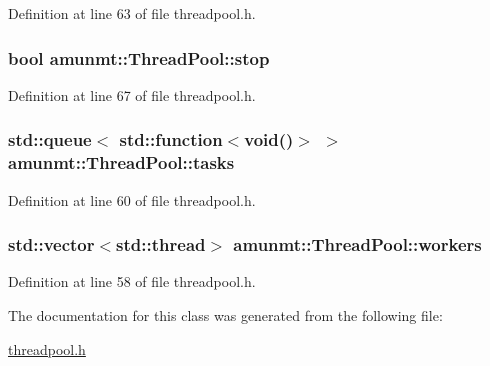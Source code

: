 Definition at line 63 of file threadpool.\+h.

\subsubsection[{\texorpdfstring{stop}{stop}}]{\setlength{\rightskip}{0pt plus 5cm}bool amunmt\+::\+Thread\+Pool\+::stop\hspace{0.3cm}{\ttfamily [private]}}\hypertarget{classamunmt_1_1ThreadPool_abf9a006374a3c361401bf98ecbfeabf7}{}\label{classamunmt_1_1ThreadPool_abf9a006374a3c361401bf98ecbfeabf7}


Definition at line 67 of file threadpool.\+h.

\subsubsection[{\texorpdfstring{tasks}{tasks}}]{\setlength{\rightskip}{0pt plus 5cm}std\+::queue$<$ std\+::function$<$void()$>$ $>$ amunmt\+::\+Thread\+Pool\+::tasks\hspace{0.3cm}{\ttfamily [private]}}\hypertarget{classamunmt_1_1ThreadPool_ab4e36abc1369312be77d1cfb04396546}{}\label{classamunmt_1_1ThreadPool_ab4e36abc1369312be77d1cfb04396546}


Definition at line 60 of file threadpool.\+h.

\subsubsection[{\texorpdfstring{workers}{workers}}]{\setlength{\rightskip}{0pt plus 5cm}std\+::vector$<$std\+::thread$>$ amunmt\+::\+Thread\+Pool\+::workers\hspace{0.3cm}{\ttfamily [private]}}\hypertarget{classamunmt_1_1ThreadPool_abd917167eb8a227f9aa7faaaec23745e}{}\label{classamunmt_1_1ThreadPool_abd917167eb8a227f9aa7faaaec23745e}


Definition at line 58 of file threadpool.\+h.



The documentation for this class was generated from the following file\+:\begin{DoxyCompactItemize}
\item 
\hyperlink{threadpool_8h}{threadpool.\+h}\end{DoxyCompactItemize}
